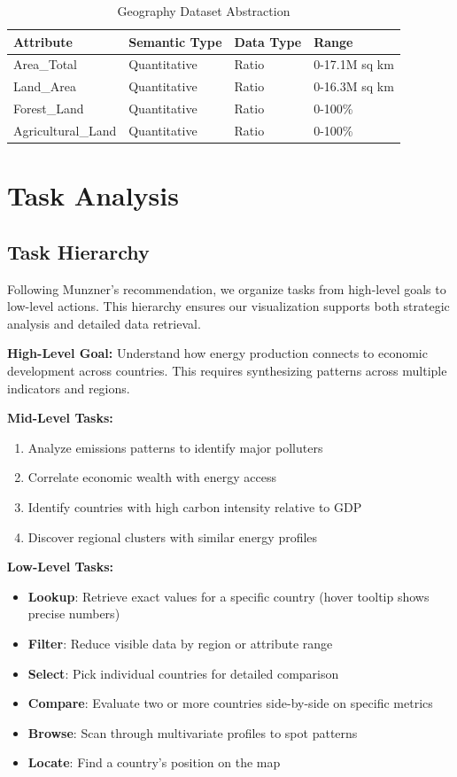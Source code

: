 \documentclass[conference]{IEEEtran}
\begin{document}
\begin{table}[h]
\centering
\caption{Geography Dataset Abstraction}
\small
\begin{tabular}{|l|l|l|p{1.1cm}|}
\hline
\textbf{Attribute} & \textbf{Semantic Type} & \textbf{Data Type} & \textbf{Range} \\ \hline
Area\_Total & Quantitative & Ratio & 0-17.1M sq km \\
Land\_Area & Quantitative & Ratio & 0-16.3M sq km \\
Forest\_Land & Quantitative & Ratio & 0-100\% \\
Agricultural\_Land & Quantitative & Ratio & 0-100\% \\ \hline
\end{tabular}
\end{table}


\section{Task Analysis}

\subsection{Task Hierarchy}
{\color{blue}
Following Munzner's recommendation, we organize tasks from high-level goals to low-level actions. This hierarchy ensures our visualization supports both strategic analysis and detailed data retrieval.

\textbf{High-Level Goal:} Understand how energy production connects to economic development across countries. This requires synthesizing patterns across multiple indicators and regions.

\textbf{Mid-Level Tasks:}
\begin{enumerate}
    \item Analyze emissions patterns to identify major polluters
    \item Correlate economic wealth with energy access
    \item Identify countries with high carbon intensity relative to GDP
    \item Discover regional clusters with similar energy profiles
\end{enumerate}

\textbf{Low-Level Tasks:}
\begin{itemize}
    \item \textbf{Lookup}: Retrieve exact values for a specific country (hover tooltip shows precise numbers)
    \item \textbf{Filter}: Reduce visible data by region or attribute range
    \item \textbf{Select}: Pick individual countries for detailed comparison
    \item \textbf{Compare}: Evaluate two or more countries side-by-side on specific metrics 
    \item \textbf{Browse}: Scan through multivariate profiles to spot patterns 
    \item \textbf{Locate}: Find a country's position on the map 
\end{itemize}
}
\end{document}
